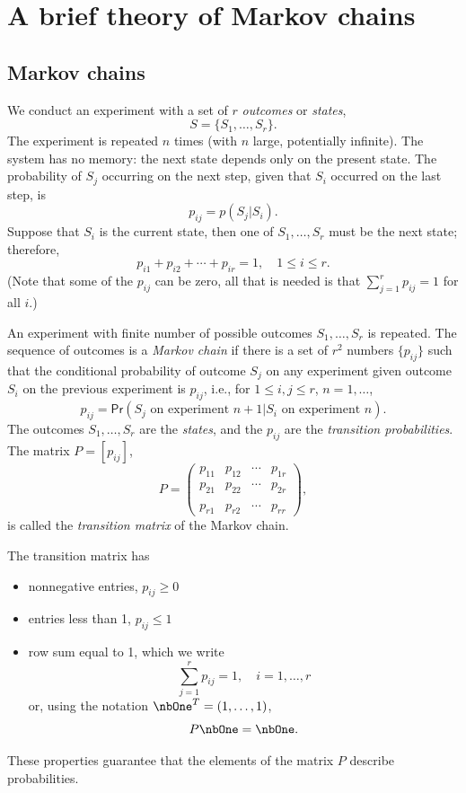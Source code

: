 \chapter{A brief theory of Markov chains}
\label{chap:markov}

\section{Markov chains}
We conduct an experiment with a set of $r$ \emph{outcomes} or \emph{states},
\[
S=\{S_1,\dots, S_r\}.
\]
The experiment is repeated $n$ times (with $n$ large, potentially infinite). 
The system has no memory: the next state depends only on the present state. 
The probability of $S_j$ occurring on the next step, given that $S_i$ occurred on the last step, is
\[
p_{ij}=p(S_j|S_i).
\]
Suppose that $S_i$ is the current state, then one of $S_1, \ldots,S_r$ must be the next state; therefore,
\[
p_{i1}+p_{i2}+\cdots+p_{ir}=1, \quad 1\leq i\leq r.
\]
(Note that some of the $p_{ij}$ can be zero, all that is needed is that $\sum_{j=1}^r p_{ij}=1$ for all $i$.)

\begin{definition}
An experiment with finite number of possible outcomes $S_1,\ldots,S_r$ is repeated. The sequence of outcomes is a \emph{Markov chain} if there is a set of $r^2$ numbers $\{p_{ij}\}$ such that the conditional probability of outcome $S_j$ on any experiment given outcome $S_i$ on the previous experiment is $p_{ij}$, i.e., for $1\leq i,j\leq r$, $n=1,\ldots$,
\[
p_{ij}=\mathsf{Pr}(S_j\textrm{ on experiment }n+1|S_i\textrm{ on experiment }n).
\]
The outcomes $S_1,\ldots,S_r$ are the \emph{states}, and the $p_{ij}$ are the \emph{transition probabilities}. The matrix $P=[p_{ij}]$,
\[
P=
\begin{pmatrix}
p_{11} & p_{12} & \cdots & p_{1r} \\
p_{21} & p_{22} & \cdots & p_{2r} \\
&&& \\
p_{r1} & p_{r2} & \cdots & p_{rr}
\end{pmatrix},
\]
is called the \emph{transition matrix} of the Markov chain. 
\end{definition}
The transition matrix has
\begin{itemize}
\item nonnegative entries, $p_{ij}\geq 0$
\item entries less than 1, $p_{ij}\leq 1$
\item row sum equal to 1, which we write
\[
\sum_{j=1}^r p_{ij}=1,\quad i=1,\ldots,r
\]
or, using the notation $\nbOne^T=(1,\ldots,1)$,
\[
P\nbOne=\nbOne.
\]
\end{itemize}
These properties guarantee that the elements of the matrix $P$ describe probabilities.


